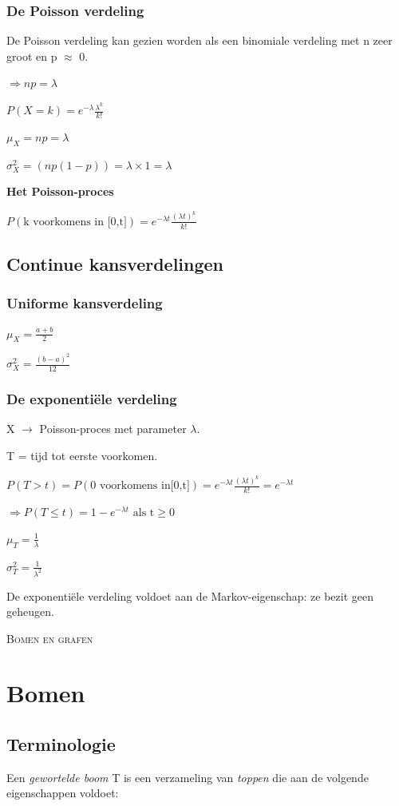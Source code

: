 \documentclass[a4paper,12pt]{article}
\begin{document}
\subsubsection{De Poisson verdeling}
De Poisson verdeling kan gezien worden als een binomiale verdeling met n  zeer groot en p $\approx$ 0.

$\Rightarrow np=\lambda$

$P(X=k)=e^{-\lambda}\frac{\lambda^k}{k!}$

$\mu_X = np=\lambda$

$\sigma^2_X=(np(1-p))=\lambda\times 1=\lambda$

\textbf{Het Poisson-proces}

$P(\text{k voorkomens in [0,t]})=e^{-\lambda t}\frac{(\lambda t)^k}{k!}$

\subsection{Continue kansverdelingen}
\subsubsection{Uniforme kansverdeling}
$\mu_X=\frac{a+b}{2}$

$\sigma^2_X=\frac{(b-a)^2}{12}$

\subsubsection{De exponentiële verdeling}
X $\rightarrow$ Poisson-proces met parameter $\lambda$.

T = tijd tot eerste voorkomen.

$P(T>t)=P(\text{0 voorkomens in[0,t]}) = e^{-\lambda t}\frac{(\lambda t)^k}{k!}=e^{-\lambda t}$

$\Rightarrow P(T\leq t) = 1-e^{-\lambda t}\text{ als t} \geq 0$

$\mu_T = \frac{1}{\lambda}$

$\sigma^2_T = \frac{1}{\lambda^2}$

De exponentiële verdeling voldoet aan de Markov-eigenschap: ze bezit geen geheugen.
\clearpage

\LARGE \textsc{Bomen en grafen}\normalsize
\section{Bomen}
\subsection{Terminologie}
Een \textit{gewortelde boom} T is een verzameling van \textit{toppen} die aan de volgende eigenschappen voldoet:
\end{document}
